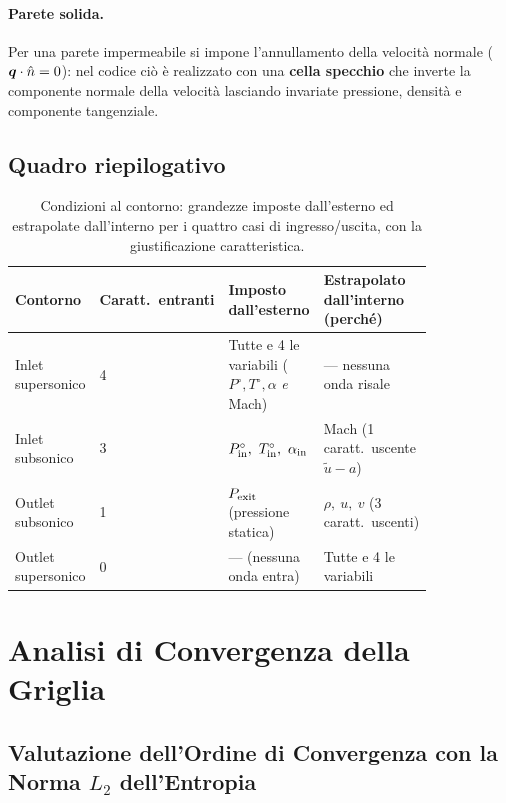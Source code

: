 \paragraph{Parete solida.}
Per una parete impermeabile si impone l'annullamento della velocità normale
($\bm{q}\cdot\hat{n} = 0$): nel codice ciò è realizzato con una \textbf{cella specchio}
che inverte la componente normale della velocità lasciando invariate pressione,
densità e componente tangenziale.

\subsection{Quadro riepilogativo}

\begin{table}[H]
\centering
\caption{Condizioni al contorno: grandezze imposte dall'esterno ed estrapolate
dall'interno per i quattro casi di ingresso/uscita, con la giustificazione
caratteristica.}
\renewcommand{\arraystretch}{1.3}
\begin{tabular}{p{0.16\linewidth} p{0.10\linewidth} p{0.27\linewidth} p{0.30\linewidth}}
\toprule
\textbf{Contorno} & \textbf{Caratt.\ entranti} & \textbf{Imposto dall'esterno} & \textbf{Estrapolato dall'interno (perché)} \\
\midrule
Inlet supersonico & 4 & Tutte e 4 le variabili ($P^\circ,T^\circ,\alpha$ \emph{e} Mach) & --- nessuna onda risale \\
Inlet subsonico & 3 & $P^\circ_{\rm in},\ T^\circ_{\rm in},\ \alpha_{\rm in}$ & Mach (1 caratt.\ uscente $\tilde u-a$) \\
Outlet subsonico & 1 & $P_{\rm exit}$ (pressione statica) & $\rho,\ u,\ v$ (3 caratt.\ uscenti) \\
Outlet supersonico & 0 & --- (nessuna onda entra) & Tutte e 4 le variabili \\
\bottomrule
\end{tabular}
\end{table}

\section{Analisi di Convergenza della Griglia}

\subsection{Valutazione dell'Ordine di Convergenza con la Norma $L_2$ dell'Entropia}
\label{sec:conv_entropia}


